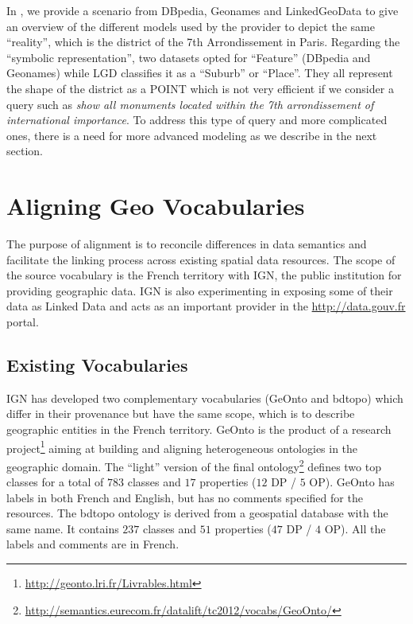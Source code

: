 \documentclass[a4paper,11pt]{report}
\begin{document}
In \cite{atemezing2012a}, we provide a scenario from DBpedia, Geonames and LinkedGeoData to give an overview of the different models used by the provider to depict the same ``reality'', which is the district of the 7th Arrondissement in Paris. Regarding the ``symbolic representation'', two datasets opted for ``Feature'' (DBpedia and Geonames) while LGD classifies it as a ``Suburb'' or ``Place''. They all represent the shape of the district as a POINT which is not very efficient if we consider a query such as \emph{show all monuments located within the 7th arrondissement of international importance}. To address this type of query and more complicated ones, there is a need for more advanced modeling as we describe in the next section.




\section{Aligning Geo Vocabularies}                                         \label{sec:alignment}
The purpose of alignment is to reconcile differences in data semantics and facilitate the linking process across existing spatial data resources. The scope of the source vocabulary is the French territory with IGN, the public institution for providing geographic data. IGN is   also experimenting in exposing some of their data as Linked Data and acts as an important provider in the \url{http://data.gouv.fr} portal.

\subsection{Existing Vocabularies}
IGN has developed two complementary vocabularies (GeOnto and bdtopo) which differ in their provenance but have the same scope, which is to describe geographic entities in the French territory. GeOnto is the product of a research project\footnote{\url{http://geonto.lri.fr/Livrables.html}} aiming at building and aligning heterogeneous ontologies in the geographic domain. The ``light'' version of the final ontology\footnote{\url{http://semantics.eurecom.fr/datalift/tc2012/vocabs/GeoOnto/}} defines two top classes for a total of $783$ classes and $17$ properties ($12$ DP / $5$ OP). GeOnto has labels in both French and English, but has no comments specified for the resources. The bdtopo ontology is derived from a geospatial database with the same name. It contains $237$ classes and $51$ properties ($47$ DP / $4$ OP). All the labels and comments are in French.
\end{document}
